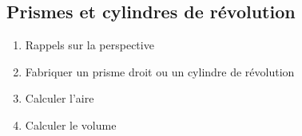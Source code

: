\subsection{Prismes et cylindres de révolution}\label{ch_5_prismes}
\begin{enumerate}
	\item Rappels sur la perspective
	\item Fabriquer un prisme droit ou un cylindre de révolution
	\item Calculer l'aire
	\item Calculer le volume
\end{enumerate}